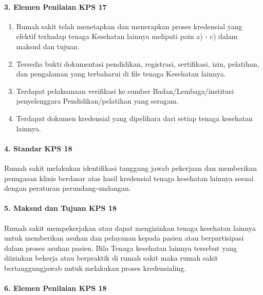 \documentclass[
]{book}
\providecommand{\tightlist}{%
  \setlength{\itemsep}{0pt}\setlength{\parskip}{0pt}}
\begin{document}
\hypertarget{elemen-penilaian-kps-17}{%
\paragraph*{3. Elemen Penilaian KPS 17}\label{elemen-penilaian-kps-17}}

\begin{enumerate}
\def\labelenumi{\alph{enumi}.}
\tightlist
\item
  Rumah sakit telah menetapkan dan menerapkan proses kredensial yang efektif terhadap tenaga Kesehatan lainnya meliputi poin a) - c) dalam maksud dan tujuan.
\item
  Tersedia bukti dokumentasi pendidikan, registrasi, sertifikasi, izin, pelatihan, dan pengalaman yang terbaharui di file tenaga Kesehatan lainnya.
\item
  Terdapat pelaksanaan verifikasi ke sumber Badan/Lembaga/institusi penyelenggara Pendidikan/pelatihan yang seragam.
\item
  Terdapat dokumen kredensial yang dipelihara dari setiap tenaga kesehatan lainnya.
\end{enumerate}

\hypertarget{standar-kps-18}{%
\paragraph*{4. Standar KPS 18}\label{standar-kps-18}}

Rumah sakit melakukan identifikasi tanggung jawab pekerjaan dan memberikan penugasan klinis berdasar atas hasil kredensial tenaga kesehatan lainnya sesuai dengan peraturan perundang-undangan.

\hypertarget{maksud-dan-tujuan-kps-18}{%
\paragraph*{5. Maksud dan Tujuan KPS 18}\label{maksud-dan-tujuan-kps-18}}

Rumah sakit mempekerjakan atau dapat mengizinkan tenaga kesehatan lainnya untuk memberikan asuhan dan pelayanan kepada pasien atau berpartisipasi dalam proses asuhan pasien.
Bila Tenaga kesehatan lainnya tersebut yang diizinkan bekerja atau berpraktik di rumah sakit maka rumah sakit bertanggungjawab untuk melakukan proses kredensialing.

\hypertarget{elemen-penilaian-kps-18}{%
\paragraph*{6. Elemen Penilaian KPS 18}\label{elemen-penilaian-kps-18}}
\end{document}

